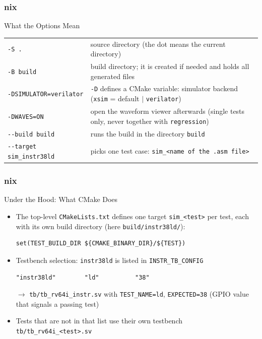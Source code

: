 \documentclass{beamer}
\newcommand{\astitle}{nix}
\newcommand{\assubtitle}{nix}
\newcommand{\cmd}[1]{\texttt{#1}}
\begin{document}
\renewcommand{\assubtitle}{What the Options Mean}
\begin{frame}
\frametitle{\astitle}
\begin{block}{\assubtitle}
  \footnotesize
  \begin{tabularx}{\linewidth}{@{}lY@{}}
    \cmd{-S .}                        & source directory (the dot means the current directory)\\[2pt]
    \cmd{-B build}                    & build directory; it is created if needed and holds all generated files\\[2pt]
    \cmd{-DSIMULATOR=verilator}       & \cmd{-D} defines a CMake variable: simulator backend
                                        (\cmd{xsim} = default $|$ \cmd{verilator})\\[2pt]
    \cmd{-DWAVES=ON}                  & open the waveform viewer afterwards
                                        (single tests only, never together with \cmd{regression})\\[2pt]
    \cmd{-{}-build build}             & runs the build in the directory \cmd{build}\\[2pt]
    \cmd{-{}-target sim\_instr38ld}   & picks one test case: \cmd{sim\_<name of the .asm file>}\\
  \end{tabularx}
\end{block}
\end{frame}

\renewcommand{\assubtitle}{Under the Hood: What CMake Does}
\begin{frame}[fragile]
\frametitle{\astitle}
\begin{block}{\assubtitle}
  \begin{itemize}
    \item The top-level \cmd{CMakeLists.txt} defines one target \cmd{sim\_<test>} per test,
      each with its own build directory (here \cmd{build/instr38ld/}):
\begin{lstlisting}
set(TEST_BUILD_DIR ${CMAKE_BINARY_DIR}/${TEST})
\end{lstlisting}
    \item Testbench selection: \cmd{instr38ld} is listed in \cmd{INSTR\_TB\_CONFIG}
\begin{lstlisting}
"instr38ld"        "ld"          "38"
\end{lstlisting}
      $\rightarrow$ \cmd{tb/tb\_rv64i\_instr.sv} with \cmd{TEST\_NAME=ld},
      \cmd{EXPECTED=38} (GPIO value that signals a passing test)
    \item Tests that are not in that list use their own testbench
      \cmd{tb/tb\_rv64i\_<test>.sv}
  \end{itemize}
\end{block}
\end{frame}
\end{document}
